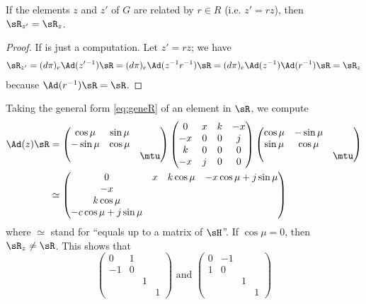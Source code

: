 \begin{proposition}
	If the elements $z$ and $z'$ of $G$ are related by $r\in R$ (i.e. $z'=rz$), then $\sR_{z'}=\sR_z$.
\end{proposition}

\begin{proof}
	If is just a computation. Let $z'=rz$; we have
	\begin{equation}
		\begin{split}
			\sR_{z'}=(d\pi)_e\Ad(z'\,\!^{-1})\sR
			=(d\pi)_e\Ad(z^{-1} r^{-1})\sR
			=(d\pi)_e\Ad(z^{-1})\Ad(r^{-1})\sR
			=\sR_z
		\end{split}
	\end{equation}
	because $\Ad(r^{-1})\sR=\sR$.
\end{proof}

Taking the general form \eqref{eq:geneR} of an element in $\sR$, we compute
\begin{equation}
	\begin{split}
		\Ad(z)\sR&=
		\begin{pmatrix}
			\cos\mu  & \sin\mu        \\
			-\sin\mu & \cos\mu        \\
			         &         & \mtu
		\end{pmatrix}
		\begin{pmatrix}
			0  & x & k & -x \\
			-x & 0 & 0 & j  \\
			k  & 0 & 0 & 0  \\
			-x & j & 0 & 0
		\end{pmatrix}
		\begin{pmatrix}
			\cos\mu & -\sin\mu        \\
			\sin\mu & \cos\mu         \\
			        &          & \mtu
		\end{pmatrix}
		\\
		&\simeq
		\begin{pmatrix}
			0 & x & k\cos\mu & -x\cos\mu+j\sin\mu \\
			-x                                    \\
			k\cos\mu                              \\
			-c\cos\mu+j\sin\mu
		\end{pmatrix}
	\end{split}
\end{equation}
where $\simeq$ stand for ``equals up to a matrix of $\sH$''. If $\cos\mu=0$, then $\sR_z\neq\sR$. This shows that
\begin{equation}
	\begin{pmatrix}
		0  & 1         \\
		-1 & 0         \\
		   &   & 1     \\
		   &   &   & 1
	\end{pmatrix}
	\text{ and }
	\begin{pmatrix}
		0 & -1         \\
		1 & 0          \\
		  &    & 1     \\
		  &    &   & 1
	\end{pmatrix}
\end{equation}
